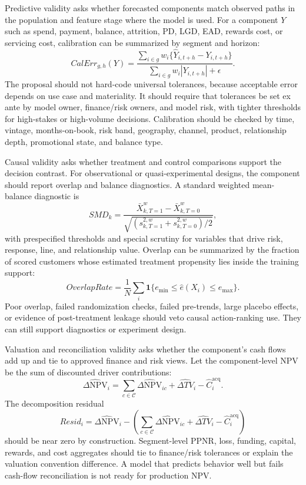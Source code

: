 \documentclass[11pt]{article}
\newcommand{\NPV}{\mathrm{NPV}}
\newcommand{\1}{\mathbf{1}}
\begin{document}
Predictive validity asks whether forecasted components match observed paths
in the population and feature stage where the model is used. For a component
$Y$ such as spend, payment, balance, attrition, PD, LGD, EAD, rewards cost, or
servicing cost, calibration can be summarized by segment and horizon:
\begin{equation}
  CalErr_{g,h}(Y)
  =
  \frac{
    \sum_{i\in g} w_i
    \{\widehat{Y}_{i,t+h}-Y_{i,t+h}\}
  }{
    \sum_{i\in g} w_i |Y_{i,t+h}|+\epsilon
  }.
  \label{eq:calibration-error}
\end{equation}
The proposal should not hard-code universal tolerances, because acceptable
error depends on use case and materiality. It should require that tolerances
be set ex ante by model owner, finance/risk owners, and model risk, with
tighter thresholds for high-stakes or high-volume decisions. Calibration
should be checked by time, vintage, months-on-book, risk band, geography,
channel, product, relationship depth, promotional state, and balance type.

Causal validity asks whether treatment and control comparisons support the
decision contrast. For observational or quasi-experimental designs, the
component should report overlap and balance diagnostics. A standard weighted
mean-balance diagnostic is
\begin{equation}
  SMD_k
  =
  \frac{
    \bar X_{k,T=1}^{w}-\bar X_{k,T=0}^{w}
  }{
    \sqrt{(s_{k,T=1}^{2,w}+s_{k,T=0}^{2,w})/2}
  },
  \label{eq:smd}
\end{equation}
with prespecified thresholds and special scrutiny for variables that drive
risk, response, line, and relationship value. Overlap can be summarized by the
fraction of scored customers whose estimated treatment propensity lies inside
the training support:
\begin{equation}
  OverlapRate
  =
  \frac{1}{N}\sum_i
  \1\{e_{\min}\le \hat e(X_i)\le e_{\max}\}.
  \label{eq:overlap-rate}
\end{equation}
Poor overlap, failed randomization checks, failed pre-trends, large placebo
effects, or evidence of post-treatment leakage should veto causal
action-ranking use. They can still support diagnostics or experiment design.

Valuation and reconciliation validity asks whether the component's cash flows
add up and tie to approved finance and risk views. Let the component-level
NPV be the sum of discounted driver contributions:
\begin{equation}
  \widehat{\Delta \NPV}_i
  =
  \sum_{c\in\mathcal{C}}
  \widehat{\Delta \NPV}_{ic}
  + \widehat{\Delta TV}_i
  - \widehat C_i^{\mathrm{acq}}.
  \label{eq:decomposition-additivity}
\end{equation}
The decomposition residual
\[
  Resid_i
  =
  \widehat{\Delta \NPV}_i
  -
  \left(
  \sum_{c\in\mathcal{C}}\widehat{\Delta \NPV}_{ic}
  +\widehat{\Delta TV}_i-\widehat C_i^{\mathrm{acq}}
  \right)
\]
should be near zero by construction. Segment-level PPNR, loss, funding,
capital, rewards, and cost aggregates should tie to finance/risk tolerances or
explain the valuation convention difference. A model that predicts behavior
well but fails cash-flow reconciliation is not ready for production NPV.
\end{document}
